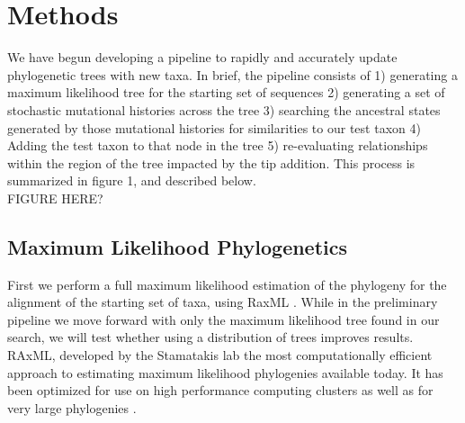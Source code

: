 \documentclass[10pt]{article}
\begin{document}
\section*{Methods}

We have begun developing a pipeline to rapidly and accurately update phylogenetic trees with new taxa. In brief, the pipeline consists of 1) generating a maximum likelihood tree for the starting set of sequences %
2) generating a set of stochastic mutational histories across the tree 3) searching the ancestral states generated by those mutational histories for similarities to our test taxon 4) Adding the test taxon to that node in the tree 5) re-evaluating relationships within the region of the tree impacted by the tip addition. This process is summarized in figure 1, and described below.
\\     FIGURE HERE?

\subsection*{Maximum Likelihood Phylogenetics}
First we perform a full maximum likelihood estimation of the phylogeny for the alignment of the starting set of taxa, using RaxML \cite{stamatakis_RAxML-VI-HPC:_2006}. While in the preliminary pipeline we move forward with only the maximum likelihood tree found in our search, we will test whether using a distribution of trees improves results. %
RAxML, developed by the Stamatakis lab the most computationally efficient approach to estimating maximum likelihood phylogenies available today. It has been optimized for use on high performance computing clusters \cite{stamatakis_RAxML-VI-HPC:_2006} as well as for very large phylogenies \cite{stamatakis_RAxML-Light:_2012}.
\end{document}

